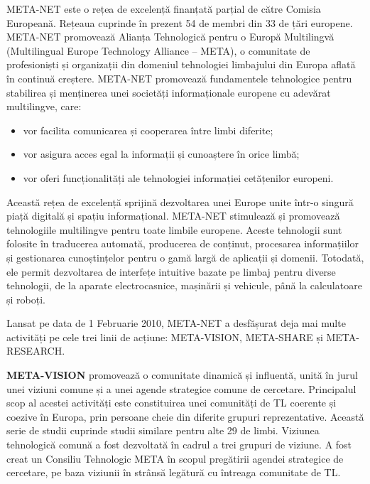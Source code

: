 \begin{multicols}{2}

META-NET este o rețea de excelență finanțată parțial de către Comisia Europeană. Rețeaua cuprinde în prezent 54 de membri din 33 de țări europene\cite{rehm2011}. META-NET promovează Alianța Tehnologică pentru o Europă Multilingvă (Multilingual Europe Technology Alliance -- META), o comunitate de profesioniști și organizații din domeniul tehnologiei limbajului din Europa aflată în continuă creștere. META-NET promovează fundamentele tehnologice pentru stabilirea și menținerea unei societăți informaționale europene cu adevărat multilingve, care:
\vspace*{-0.007 cm}
\begin{itemize}
\item vor facilita comunicarea și cooperarea între limbi diferite;
\item vor asigura acces egal la informații și cunoaștere în orice limbă;
\item vor oferi funcționalități ale tehnologiei informației cetățenilor europeni.
\end{itemize}

Această rețea de excelență sprijină dezvoltarea unei Europe unite \mbox{într-o} singură piață digitală și spațiu informațional. META-NET stimulează și promovează tehnologiile multilingve pentru toate limbile europene. Aceste tehnologii sunt folosite în traducerea automată, producerea de conținut, procesarea informațiilor și gestionarea cunoștințelor pentru o gamă largă de aplicații și domenii. Totodată, ele permit dezvoltarea de interfețe intuitive bazate pe limbaj pentru diverse tehnologii, de la aparate electrocasnice, mașinării și vehicule, până la calculatoare și roboți.

Lansat pe data de 1 Februarie 2010, META-NET a desfășurat deja mai multe activități pe cele trei linii de acțiune: META-VISION, META-SHARE și META-RESEARCH.

\textbf{META-VISION} promovează o comunitate dinamică și influentă, unită în jurul unei viziuni comune și a unei agende strategice comune de cercetare. Principalul scop al acestei activități este constituirea unei comunități de TL coerente și coezive în Europa, prin persoane cheie din diferite grupuri reprezentative. Această serie de studii cuprinde studii similare pentru alte 29 de limbi. Viziunea tehnologică comună a fost dezvoltată în cadrul a trei grupuri de viziune. A fost creat un Consiliu Tehnologic META în scopul pregătirii agendei strategice de cercetare, pe baza viziunii în strânsă legătură cu întreaga comunitate de TL.%


\end{multicols}
